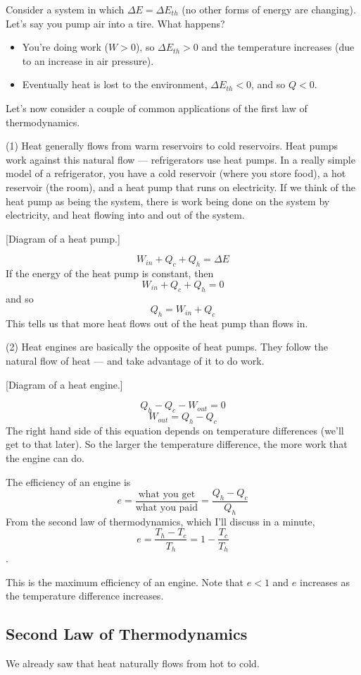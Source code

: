 Consider a system in which $\Delta{E}=\Delta{E_{th}}$ (no other forms of energy are changing). Let's say you pump air into a tire. What happens?
\begin{itemize}
\item You're doing work ($W>0$), so $\Delta{E_{th}}>0$ and the temperature increases (due to an increase in air pressure).
\item Eventually heat is lost to the environment, $\Delta{E_{th}}<0$, and so $Q<0$.
\end{itemize}

Let's now consider a couple of common applications of the first law of thermodynamics.

(1) Heat generally flows from warm reservoirs to cold reservoirs. Heat pumps work against this natural flow --- refrigerators use heat pumps. In a really simple model of a refrigerator, you have a cold reservoir (where you store food), a hot reservoir (the room), and a heat pump that runs on electricity. If we think of the heat pump as being the system, there is work being done on the system by electricity, and heat flowing into and out of the system.

[Diagram of a heat pump.]
\vspace{5cm}

$$W_{in}+Q_c+Q_h=\Delta{E}$$
If the energy of the heat pump is constant, then
$$W_{in}+Q_c+Q_h=0$$
and so
$$Q_h=W_{in}+Q_c$$
This tells us that more heat flows out of the heat pump than flows in.

(2) Heat engines are basically the opposite of heat pumps. They follow the natural flow of heat --- and take advantage of it to do work.

[Diagram of a heat engine.]\nopagebreak
\vspace{5cm}

$$Q_h-Q_c-W_{out}=0$$
$$W_{out}=Q_h-Q_c$$
The right hand side of this equation depends on temperature differences (we'll get to that later). So the larger the temperature difference, the more work that the engine can do.

The efficiency of an engine is
$$e=\frac{\mbox{what you get}}{\mbox{what you paid}}=\frac{Q_h-Q_c}{Q_h}$$
From the second law of thermodynamics, which I'll discuss in a minute,
$$e=\frac{T_h-T_c}{T_h}=1-\frac{T_c}{T_h}$$.

This is the maximum efficiency of an engine. Note that $e<1$ and $e$ increases as the temperature difference increases.


\subsection{Second Law of Thermodynamics}
We already saw that heat naturally flows from hot to cold.

